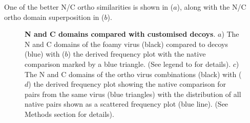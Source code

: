 One of the better N/C ortho similarities is shown in ($a$), along with the
N/C ortho domain superposition in ($b$).
%
%
%
%
%
%
 
\begin{figure}
\centering
{}
\begin{footnotesize}
\caption{
\label{Fig:fitsNC}
{\bf N and C domains compared with customised decoys}.
$a$) The N and C domains of the foamy virus (black) compared to decoys (blue) with ($b$) the derived frequency plot with the
native comparison marked by a blue triangle.  (See legend to  for details).
$c$) The N and C domains of the ortho virus combinations (black) with ($d$) the derived frequency plot showing the
native comparison for pairs from the same virus (blue triangles) with the distribution of all native pairs
shown as a scattered frequency plot (blue line).
(See Methods section for details).
}
\end{footnotesize}
\end{figure}

